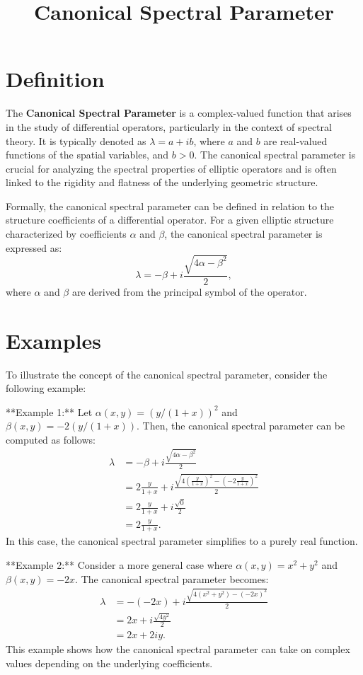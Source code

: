 \documentclass[11pt,a4paper]{article}
\title{Canonical Spectral Parameter}
\date{}
\begin{document}
\maketitle
\section{Definition}
The \textbf{Canonical Spectral Parameter} is a complex-valued function that arises in the study of differential operators, particularly in the context of spectral theory. It is typically denoted as $\lambda = a + ib$, where $a$ and $b$ are real-valued functions of the spatial variables, and $b > 0$. The canonical spectral parameter is crucial for analyzing the spectral properties of elliptic operators and is often linked to the rigidity and flatness of the underlying geometric structure.

Formally, the canonical spectral parameter can be defined in relation to the structure coefficients of a differential operator. For a given elliptic structure characterized by coefficients $\alpha$ and $\beta$, the canonical spectral parameter is expressed as:
\begin{equation}
\lambda = -\beta + i \frac{\sqrt{4\alpha - \beta^2}}{2},
\end{equation}
where $\alpha$ and $\beta$ are derived from the principal symbol of the operator.

\section{Examples}
To illustrate the concept of the canonical spectral parameter, consider the following example:

**Example 1:**
Let $\alpha(x, y) = (y/(1+x))^2$ and $\beta(x, y) = -2(y/(1+x))$. Then, the canonical spectral parameter can be computed as follows:
\begin{align*}
\lambda &= -\beta + i \frac{\sqrt{4\alpha - \beta^2}}{2} \\
&= 2\frac{y}{1+x} + i \frac{\sqrt{4\left(\frac{y}{1+x}\right)^2 - \left(-2\frac{y}{1+x}\right)^2}}{2} \\
&= 2\frac{y}{1+x} + i \frac{\sqrt{0}}{2} \\
&= 2\frac{y}{1+x}.
\end{align*}
In this case, the canonical spectral parameter simplifies to a purely real function.

**Example 2:**
Consider a more general case where $\alpha(x, y) = x^2 + y^2$ and $\beta(x, y) = -2x$. The canonical spectral parameter becomes:
\begin{align*}
\lambda &= -(-2x) + i \frac{\sqrt{4(x^2 + y^2) - (-2x)^2}}{2} \\
&= 2x + i \frac{\sqrt{4y^2}}{2} \\
&= 2x + 2iy.
\end{align*}
This example shows how the canonical spectral parameter can take on complex values depending on the underlying coefficients.
\end{document}
